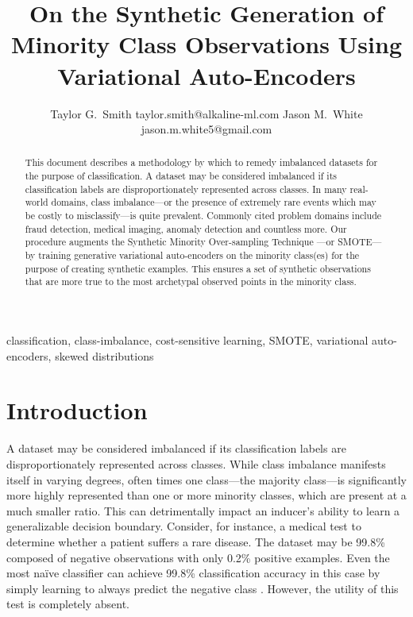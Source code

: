 \documentclass[twoside,11pt]{article}
\begin{document}
\title{On the Synthetic Generation of Minority Class Observations Using Variational Auto-Encoders}

\author{\name Taylor G.\ Smith \email taylor.smith@alkaline-ml.com
       \AND
       \name Jason M.\ White \email jason.m.white5@gmail.com}

\maketitle

\begin{abstract}%
This document describes a methodology by which to remedy imbalanced datasets for the purpose of classification. A dataset may be considered imbalanced if its classification labels are disproportionately represented across classes. In many real-world domains, class imbalance---or the presence of extremely rare events which may be costly to misclassify---is quite prevalent. Commonly cited problem domains include fraud detection, medical imaging, anomaly detection and countless more.  Our procedure augments the Synthetic Minority Over-sampling Technique \citep*{chawla2002smote}---or SMOTE---by training generative variational auto-encoders on the minority class(es) for the purpose of creating synthetic examples. This ensures a set of synthetic observations that are more true to the most archetypal observed points in the minority class.
\end{abstract}

\begin{keywords}
  classification, class-imbalance, cost-sensitive learning, SMOTE, variational auto-encoders, skewed distributions
\end{keywords}

\section{Introduction}

A dataset may be considered imbalanced if its classification labels are disproportionately represented across classes. While class imbalance manifests itself in varying degrees, often times one class---the majority class---is significantly more highly represented than one or more minority classes, which are present at a much smaller ratio. This can detrimentally impact an inducer's ability to learn a generalizable decision boundary. Consider, for instance, a medical test to determine whether a patient suffers a rare disease. The dataset may be 99.8\% composed of negative observations with only 0.2\% positive examples. Even the most na\"ive classifier can achieve 99.8\% classification accuracy in this case by simply learning to always predict the negative class \citep{lewis1994heterogeneous}. However, the utility of this test is completely absent. 
\end{document}
